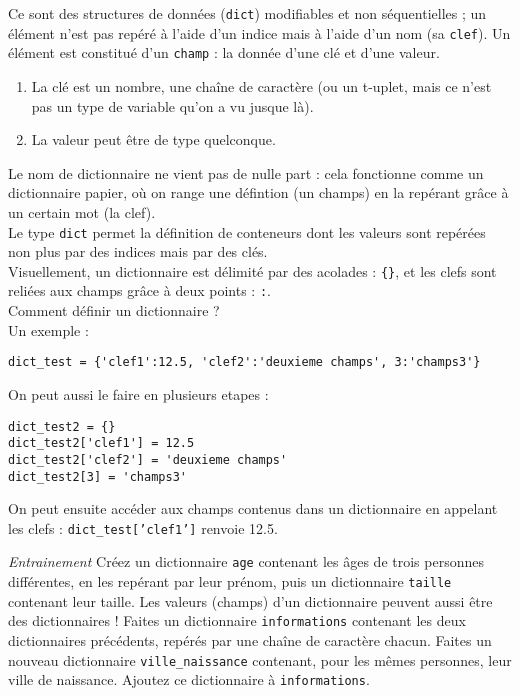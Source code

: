 

Ce sont des structures de données (\texttt{dict}) modifiables et non séquentielles ; un élément n'est pas repéré à l'aide d'un indice mais à l'aide d'un nom (sa \texttt{clef}). Un élément est constitué d'un \texttt{champ} : la donnée d'une clé et d'une valeur.
\begin{enumerate}
	\item La clé est un nombre, une chaîne de caractère (ou un t-uplet, mais ce n'est pas un type de variable qu'on a vu jusque là).
	\item La valeur peut être de type quelconque.
\end{enumerate}
Le nom de dictionnaire ne vient pas de nulle part : cela fonctionne comme un dictionnaire papier, où on range une défintion (un champs) en la repérant grâce à un certain mot (la clef).\\
Le type \texttt{dict} permet la définition de conteneurs dont les valeurs sont repérées non plus par des indices mais par des clés. \\

Visuellement, un dictionnaire est délimité par des acolades : \texttt{\{\}}, et les clefs sont reliées aux champs grâce à deux points : \texttt{:}.\\

Comment définir un dictionnaire ?\\
Un exemple :
\begin{verbatim}
dict_test = {'clef1':12.5, 'clef2':'deuxieme champs', 3:'champs3'}
\end{verbatim}
On peut aussi le faire en plusieurs etapes :
\begin{verbatim}
dict_test2 = {}
dict_test2['clef1'] = 12.5
dict_test2['clef2'] = 'deuxieme champs'
dict_test2[3] = 'champs3'
\end{verbatim}

On peut ensuite accéder aux champs contenus dans un dictionnaire en appelant les clefs : \texttt{dict_test['clef1']} renvoie 12.5.

\textit{Entrainement}
\quessques Créez un dictionnaire \texttt{age} contenant les âges de trois personnes différentes, en les repérant par leur prénom, puis un dictionnaire \texttt{taille} contenant leur taille.
\ssques Les valeurs (champs) d'un dictionnaire peuvent aussi être des dictionnaires ! Faites un dictionnaire \texttt{informations} contenant les deux dictionnaires précédents, repérés par une chaîne de caractère chacun.
\ssques Faites un nouveau dictionnaire \texttt{ville\_naissance} contenant, pour les mêmes personnes, leur ville de naissance. Ajoutez ce dictionnaire à \texttt{informations}.

